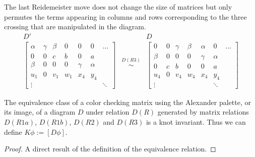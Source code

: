\begin{center}
\end{center}


The last Reidemeister move does not change the size of matrices but only permutes the terms appearing in columns and rows corresponding to the three crossing that are manipulated in the diagram.
$$
\begin{matrix}
  D' & & D \\ 
  \begin{bmatrix}
    \alpha & \gamma & \beta & 0 & 0 & 0 & \hdots \\ 
    0 & 0 & c & b & 0 & a \\ 
    \beta & 0 & 0 & 0 & \gamma & \alpha \\ 
    u_1 & 0 & v_1 & w_1 & x_4 & y_4 \\ 
    \vdots & & & & & & \ddots
  \end{bmatrix} & \overset{D(R3)}{\sim}
     & 
  \begin{bmatrix}
    0 & 0 & \gamma & \beta & \alpha & 0 & \hdots  \\ 
    \beta & 0 & 0 & 0 & \gamma & \alpha \\ 
    0 & c & b & 0 & 0 & a\\ 
    u_4 & 0 & v_4 & w_4 & x_4 & y_4\\ 
    \vdots & & &  & & \ddots
  \end{bmatrix}
\end{matrix}
$$

\begin{theorem}
  The equivalence class of a color checking matrix using the Alexander palette, or its image, of a diagram $D$ under relation $D(R)$ generated by matrix relations $D(R1a)$, $D(R1b)$, $D(R2)$ and $D(R3)$ is a knot invariant. Thus we can define $K\phi:=[D\phi]$.
\end{theorem}

\begin{proof}
  A direct result of the definition of the equivalence relation.
\end{proof}
